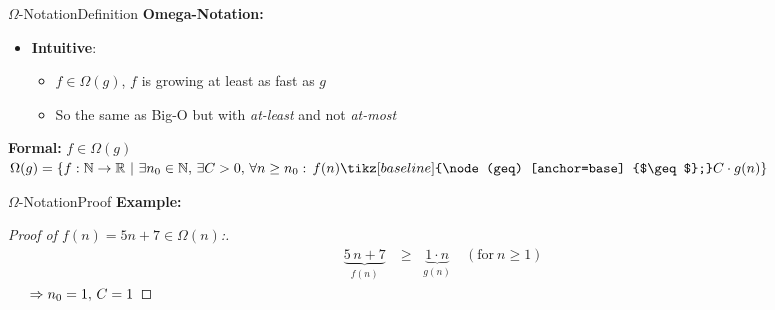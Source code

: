 \begin{frame}{$\Omega$-Notation}{Definition}
  \textbf{Omega-Notation:}
  \begin{itemize}
    \item
      \textbf{Intuitive}:
      \begin{itemize}
        \item
          $f \in \Omega(g)$, $f$ is growing at least as fast as $g$
        \item
          So the same as Big-O but with \textit{at-least} and not
          \textit{at-most}
      \end{itemize}
  \end{itemize}
  \begin{block}{\textbf{Formal:} $f \in \Omega(g)$}
    \begin{math}
      \Omega(g) = \lbrace f: \mathbb{N} \to \mathbb{R} ~ | ~
        \exists n_0 \in \mathbb{N}, \, \exists C > 0, \,  \forall n \geq n_0:\,
        f(n) \tikz[baseline] {\node (geq) [anchor=base] {$\geq$};}
        C \cdot g(n)\rbrace
    \end{math}
  \end{block}
  \begin{center}
  \end{center}
\end{frame}


\begin{frame}{$\Omega$-Notation}{Proof}
  \label{slide:prooftwo}
  \textbf{Example:}\\
  \begin{proof}[Proof of $f(n) = 5n + 7 \in \Omega(n)$:]
    \begin{eqnarray*}
      &\underbrace{5 \, n + 7}_{f(n)} &\geq \;\; \underbrace{1 \cdot n}_{g(n)}
      \hspace{1em} (\text{for} ~ n \geq 1)
    \end{eqnarray*}
    $\hspace{1.5em} \Rightarrow n_0 = 1, \, C = 1$ \qedhere
  \end{proof}
\end{frame}

